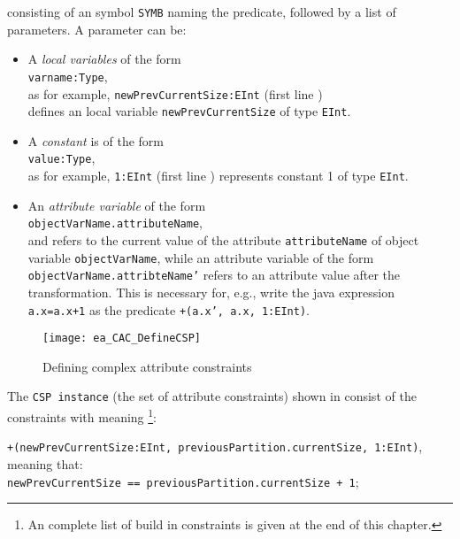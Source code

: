 \noindent consisting of an symbol \texttt{SYMB} naming the predicate, followed by a list of parameters. A parameter can be:
\begin{itemize}
    \item A \emph{local variables} of the form \\
    \hspace*{0.5cm} \texttt{varname:Type},\\
    as for example, \texttt{newPrevCurrentSize:EInt} (first line )\\
     defines an local variable \texttt{newPrevCurrentSize} of type \texttt{EInt}. 
    \item A \emph{constant} is of the form \\
    \hspace*{0.5cm} \texttt{value:Type},\\
    as for example, \texttt{1:EInt} (first line ) represents constant 1 of type \texttt{EInt}.
    \item An \emph{attribute variable} of the form \\
    \hspace*{0.5cm}\texttt{objectVarName.attributeName}, \\
     and refers to the current value of the attribute \texttt{attributeName} of object variable 	\texttt{objectVarName}, while an attribute variable of the form \texttt{objectVarName.attribteName'} refers to an attribute value after the transformation. This is necessary for, 	e.g., write the java expression \texttt{a.x=a.x+1} as the predicate \texttt{+(a.x', a.x, 1:EInt)}. 
\end{itemize}


 
\begin{figure}[htbp]
\begin{center}
  \texttt{[image: ea\_CAC\_DefineCSP]}
  \caption{Defining complex attribute constraints}  
  \label{ea:ea_CAC_DefineCSP}
\end{center}
\end{figure}

The \texttt{CSP instance} (the set of attribute constraints) shown in  consist of the constraints with meaning \footnote{An complete list of build in constraints is given at the end of this chapter.}:

\hspace*{0.5cm}\texttt{\small +(newPrevCurrentSize:EInt, previousPartition.currentSize, 1:EInt)},\\
meaning that:\\
\hspace*{0.5cm}\texttt{\small newPrevCurrentSize == previousPartition.currentSize + 1};

